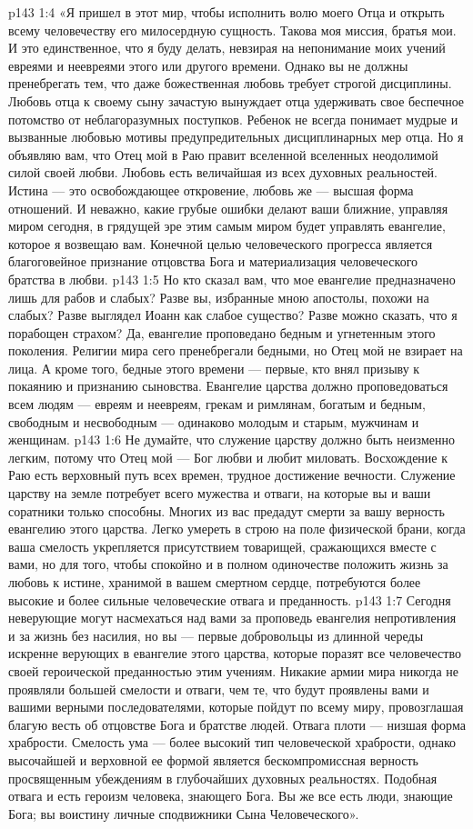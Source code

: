 \vs p143 1:4 «Я пришел в этот мир, чтобы исполнить волю моего Отца и открыть всему человечеству его милосердную сущность. Такова моя миссия, братья мои. И это единственное, что я буду делать, невзирая на непонимание моих учений евреями и неевреями этого или другого времени. Однако вы не должны пренебрегать тем, что даже божественная любовь требует строгой дисциплины. Любовь отца к своему сыну зачастую вынуждает отца удерживать свое беспечное потомство от неблагоразумных поступков. Ребенок не всегда понимает мудрые и вызванные любовью мотивы предупредительных дисциплинарных мер отца. Но я объявляю вам, что Отец мой в Раю правит вселенной вселенных неодолимой силой своей любви. Любовь есть величайшая из всех духовных реальностей. Истина --- это освобождающее откровение, любовь же --- высшая форма отношений. И неважно, какие грубые ошибки делают ваши ближние, управляя миром сегодня, в грядущей эре этим самым миром будет управлять евангелие, которое я возвещаю вам. Конечной целью человеческого прогресса является благоговейное признание отцовства Бога и материализация человеческого братства в любви.
\vs p143 1:5 Но кто сказал вам, что мое евангелие предназначено лишь для рабов и слабых? Разве вы, избранные мною апостолы, похожи на слабых? Разве выглядел Иоанн как слабое существо? Разве можно сказать, что я порабощен страхом? Да, евангелие проповедано бедным и угнетенным этого поколения. Религии мира сего пренебрегали бедными, но Отец мой не взирает на лица. А кроме того, бедные этого времени --- первые, кто внял призыву к покаянию и признанию сыновства. Евангелие царства должно проповедоваться всем людям --- евреям и неевреям, грекам и римлянам, богатым и бедным, свободным и несвободным --- одинаково молодым и старым, мужчинам и женщинам.
\vs p143 1:6 Не думайте, что служение царству должно быть неизменно легким, потому что Отец мой --- Бог любви и любит миловать. Восхождение к Раю есть верховный путь всех времен, трудное достижение вечности. Служение царству на земле потребует всего мужества и отваги, на которые вы и ваши соратники только способны. Многих из вас предадут смерти за вашу верность евангелию этого царства. Легко умереть в строю на поле физической брани, когда ваша смелость укрепляется присутствием товарищей, сражающихся вместе с вами, но для того, чтобы спокойно и в полном одиночестве положить жизнь за любовь к истине, хранимой в вашем смертном сердце, потребуются более высокие и более сильные человеческие отвага и преданность.
\vs p143 1:7 Сегодня неверующие могут насмехаться над вами за проповедь евангелия непротивления и за жизнь без насилия, но вы --- первые добровольцы из длинной череды искренне верующих в евангелие этого царства, которые поразят все человечество своей героической преданностью этим учениям. Никакие армии мира никогда не проявляли большей смелости и отваги, чем те, что будут проявлены вами и вашими верными последователями, которые пойдут по всему миру, провозглашая благую весть об отцовстве Бога и братстве людей. Отвага плоти --- низшая форма храбрости. Смелость ума --- более высокий тип человеческой храбрости, однако высочайшей и верховной ее формой является бескомпромиссная верность просвященным убеждениям в глубочайших духовных реальностях. Подобная отвага и есть героизм человека, знающего Бога. Вы же все есть люди, знающие Бога; вы воистину личные сподвижники Сына Человеческого».
